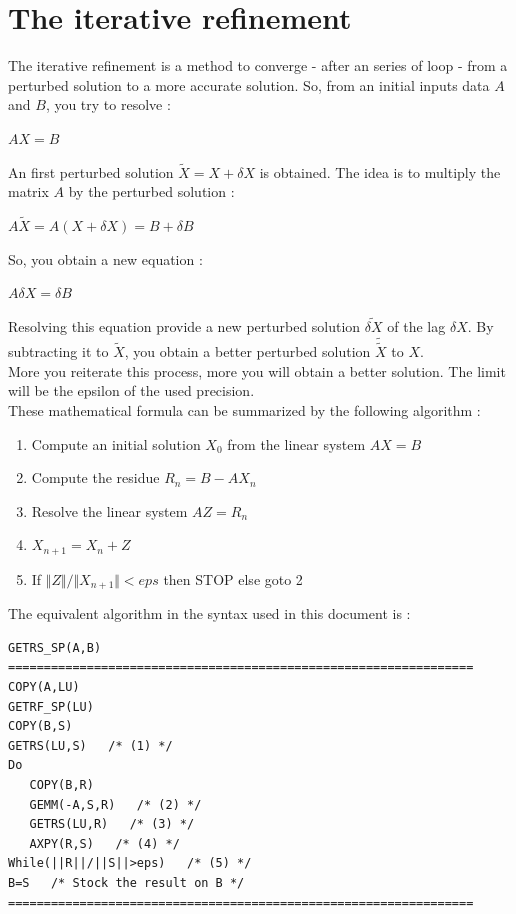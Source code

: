 \documentclass{report}
\begin{document}
\section{The iterative refinement}
The iterative refinement is a method to converge - after an series of loop - from a perturbed solution to a more accurate solution. So, from an initial inputs data $A$ and $B$, you try to resolve :
\begin{center}
$AX=B$
\end{center}
An first perturbed solution $\tilde{X}=X+\delta{X}$ is obtained. The idea is to multiply the matrix $A$ by the perturbed solution :
\begin{center}
$A\tilde{X}=A(X+\delta{X})=B+\delta{B}$
\end{center}
So, you obtain a new equation :
\begin{center}
$A\delta{X}=\delta{B}$
\end{center}
Resolving this equation provide a new perturbed solution $\widetilde{\delta{X}}$ of the lag $\delta{X}$. By subtracting it to $\tilde{X}$, you obtain a better perturbed solution $\tilde{\tilde{X}}$ to $X$.\\
More you reiterate this process, more you will obtain a better solution. The limit will be the epsilon of the used precision.\\
These mathematical formula can be summarized by the following algorithm :
\begin{enumerate}
\item Compute an initial solution $X_0$ from the linear system $AX=B$
\item Compute the residue $R_n=B-AX_n$
\item Resolve the linear system $AZ=R_n$
\item $X_{n+1}=X_n+Z$
\item If $\Vert{Z}\Vert/\Vert{X_{n+1}}\Vert<eps$ then STOP else goto 2
\end{enumerate}
The equivalent algorithm in the syntax used in this document is :
\begin{verbatim}
GETRS_SP(A,B)
=================================================================
COPY(A,LU)
GETRF_SP(LU)
COPY(B,S)
GETRS(LU,S)   /* (1) */
Do
   COPY(B,R)   
   GEMM(-A,S,R)   /* (2) */
   GETRS(LU,R)   /* (3) */
   AXPY(R,S)   /* (4) */
While(||R||/||S||>eps)   /* (5) */
B=S   /* Stock the result on B */
=================================================================
\end{verbatim}
\end{document}
